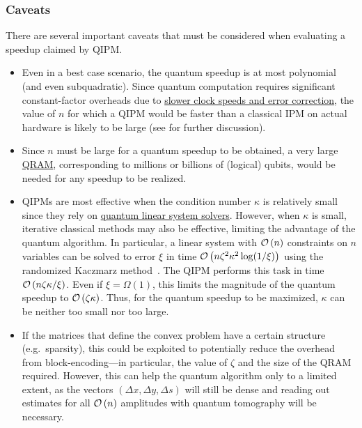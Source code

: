 \begin{refsection}
\subsubsection*{Caveats}
There are several important caveats that must be considered when evaluating a speedup claimed by QIPM.
\begin{itemize}
    \item Even in a best case scenario, the quantum speedup is at most polynomial (and even subquadratic). Since quantum computation requires significant constant-factor overheads due to \hyperref[prim:QEC]{slower clock speeds and error correction}, the value of $n$ for which a QIPM would be faster than a classical IPM on actual hardware is likely to be large (see \cite{dalzell2022socp} for further discussion). 
    \item Since $n$ must be large for a quantum speedup to be obtained, a very large \hyperref[prim:QRAM]{QRAM}, corresponding to millions or billions of (logical) qubits, would be needed for any speedup to be realized. 
    \item QIPMs are most effective when the condition number $\kappa$ is relatively small since they rely on \hyperref[prim:QuantumLinearSystemSolvers]{quantum linear system solvers}. However, when $\kappa$ is small, iterative classical methods may also be effective, limiting the advantage of the quantum algorithm. In particular, a linear system with $\mathcal{O}\left( n \right)$ constraints on $n$ variables can be solved to error $\xi$ in time $\mathcal{O}\left( n\zeta^2 \kappa^2\log(1/\xi) \right)$ using the randomized Kaczmarz method~\cite{strohmer2009kaczmarz}. The QIPM performs this task in time $\mathcal{O}\left( n \zeta \kappa/\xi \right)$. Even if $\xi = \Omega(1)$, this limits the magnitude of the quantum speedup to $\mathcal{O}\left( \zeta \kappa \right)$. Thus, for the quantum speedup to be maximized, $\kappa$ can be neither too small nor too large. 
    \item If the matrices that define the convex problem have a certain structure (e.g.~sparsity), this could be exploited to potentially reduce the overhead from block-encoding---in particular, the value of $\zeta$ and the size of the QRAM required. However, this can help the quantum algorithm only to a limited extent, as the vectors $(\Delta x, \Delta y, \Delta s)$ will still be dense and reading out estimates for all $\mathcal{O}\left( n \right)$ amplitudes with quantum tomography will be necessary.
\end{itemize}



\end{refsection}
